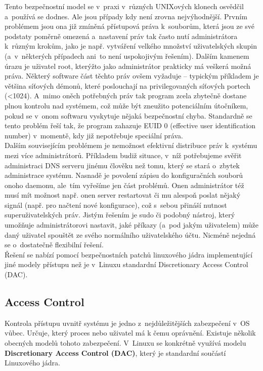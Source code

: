 \documentclass[a4paper,12pt]{article}
\renewcommand{\b}[1]{\textbf{#1}} %
\begin{document}
Tento bezpečnostní model se v~praxi v~různých UNIXových klonech osvědčil a~používá se dodnes. Ale jsou případy kdy není zrovna nejvýhodnější. Prvním problémem jsou ona již zmíněná přístupová práva k~souborům, která jsou ze své podstaty poměrně omezená a~nastavení práv tak často nutí administrátora k~různým krokům, jako je např. vytváření velkého množství uživatelských skupin (a~v~některých případech ani~to není uspokojivým řešením).
Dalším kamenem úrazu je uživatel root, kterýžto jako administrátor prakticky má veškerá možná práva. Některý software část těchto práv ovšem vyžaduje – typickým příkladem je většina síťových démonů, které poslouchají na privilegovaných síťových portech (<1024). A~mimo oněch potřebných práv tak program zcela zbytečně dostane plnou kontrolu nad systémem, což může být zneužito potenciálním útočníkem, pokud se v~onom softwaru vyskytuje nějaká bezpečnostní chyba. Standardně se tento problém řeší tak, že program zahazuje EUID 0 (effective user identification number) v~momentě, kdy již nepotřebuje speciální práva.~\cite{LINUXZONEGrsecurity}\\

Dalším souvisejícím problémem je nemožnost efektivní distribuce práv k~systému mezi více administrátorů. Příkladem budiž situace, v~níž potřebujeme svěřit administraci DNS serveru jinému člověku než tomu, který se stará o~zbytek administrace systému. Nasnadě je povolení zápisu do konfiguračních souborů onoho daemonu, ale~tím vyřešíme jen část problémů. Onen administrátor též musí mít možnost např. onen server restartovat či mu alespoň poslat nějaký signál (např. pro načtení nové konfigurace), což s~sebou přináší nutnost superuživatelských práv. Jistým řešením je sudo či podobný nástroj, který umožňuje administrátorovi nastavit, jaké příkazy (a~pod jakým uživatelem) může daný uživatel spouštět ze svého normálního uživatelského účtu. Nicméně nejedná se o~dostatečně flexibilní řešení.~\cite{LINUXZONEGrsecurity}\\

Řešení se nabízí pomocí bezpečnostních patchů linuxového jádra implementující jiné modely přístupu než je v~Linuxu standardní Discretionary Access Control (DAC).

\subsection{Access Control}

Kontrola přístupu uvnitř systému je jedno z~nejdůležitějších zabezpečení v~OS vůbec. Určuje, který proces nebo uživatel má k čemu oprávnění. Existuje několik obecných modelů tohoto zabezpečení. V~Linuxu se konkrétně využívá modelu \b{Discretionary Access Control (DAC)}, který je standardní součástí Linuxového jádra.
\end{document}
